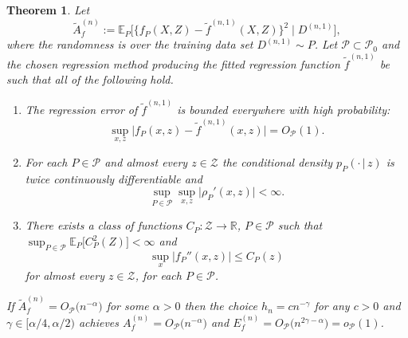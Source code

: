 \documentclass[aos]{imsart}
\newcommand{\R}{\mathbb{R}}
\newcommand{\E}{\mathbb{E}}
\newcommand{\given}{\,|\,}
\newtheorem{theorem}{Theorem}
\begin{document}
	
	\begin{theorem}
		\label{thm:hrate}
		Let
		\[
		\tilde{A}_f^{(n)} := \E_P\Big[\big\{f_P(X,Z)-\tilde f^{(n,1)}(X,Z)\big\}^2 \;\Big| \; D^{(n,1)}\Big],
		\] where
		the randomness is over the training data set $D^{(n,1)}\sim P$. Let $\mathcal{P} \subset \mathcal{P}_0$ and the chosen regression method producing the fitted regression function $\tilde{f}^{(n, 1)}$ be such that all of the following hold.
		\begin{enumerate}[label=(\roman*)]
			\item The regression error of $\tilde f^{(n,1)}$ is bounded everywhere with high probability:
			\begin{equation*}
				\sup_{x,z}\big|f_P(x,z) - \tilde f^{(n,1)}(x,z)\big|  = O_{\mathcal{P}}(1).
			\end{equation*} 
			\item For each $P\in\mathcal{P}$ and almost every $z\in\mathcal{Z}$ the conditional density $p_P(\cdot\given  z)$ is twice continuously differentiable and
			\begin{equation} \label{eq:score_Lipschitz}
				\sup_{P\in \mathcal{P}} \sup_{x,z} \big| \rho_P'(x,z)\big| < \infty.
			\end{equation}
			\item There exists a class of functions $C_P:\mathcal{Z}\to\R$, $P\in\mathcal{P}$ such that $\sup_{P\in\mathcal{P}} \E_P\big[C_P^2(Z)\big] < \infty$ and \begin{equation}
				\sup_{x} \big|f_P''(x,z)\big| \leq C_P(z) \label{eqn:resmooththmderivbounds}
			\end{equation} 
			for almost every $z\in\mathcal{Z}$, for each $P\in\mathcal{P}$.
		\end{enumerate}
		If $\tilde{A}_f^{(n)} = O_{\mathcal{P}}\big(n^{-\alpha}\big)$ for some $\alpha > 0$
		then the choice $h_n = c n^{-\gamma}$ for any $c>0$ and $\gamma \in [\alpha/4, \alpha/2)$
		achieves $A_f^{(n)} = O_{\mathcal{P}}\big(n^{-\alpha}\big)$ and $E_f^{(n)} = O_{\mathcal{P}}\big(n^{2\gamma-\alpha}\big) = o_{\mathcal{P}}(1)$.
	\end{theorem}
\end{document}
